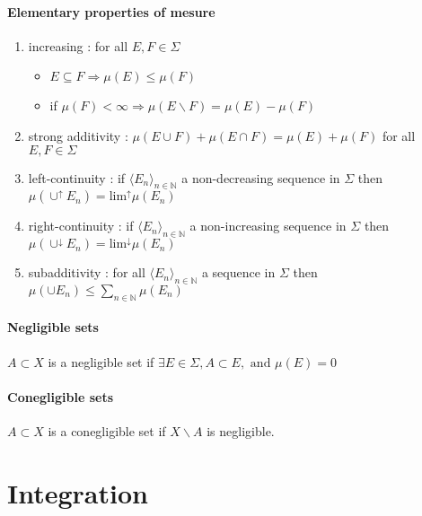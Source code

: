 \documentclass[a4paper,10pt]{article}
\begin{document}
\paragraph{Elementary properties of mesure}
\begin{enumerate}
 \item increasing : for all $E,F \in \Sigma$ 
 \begin{itemize}
  \item $E \subseteq F \Longrightarrow \mu(E) \leq \mu(F)$
  \item if $\mu(F) < \infty  \Longrightarrow \mu(E\backslash F) = \mu(E) - \mu(F)$
 \end{itemize}

 \item strong additivity : $\mu(E\cup F) + \mu(E\cap F) = \mu(E) + \mu(F)$ for all $E,F \in \Sigma$ 
 \item left-continuity : if $\langle E_{n} \rangle_{n \in \mathbb{N}}$ a non-decreasing sequence in $\Sigma$ then 
 $\mu(\cup^{\uparrow} E_{n}) = \text{lim}^{\uparrow} \mu(E_{n})$
 \item right-continuity : if $\langle E_{n} \rangle_{n \in \mathbb{N}}$ a non-increasing sequence in $\Sigma$ then 
 $\mu(\cup^{\downarrow} E_{n}) = \text{lim}^{\downarrow} \mu(E_{n})$
 \item subadditivity : for all $\langle E_{n} \rangle_{n \in \mathbb{N}}$ a sequence in $\Sigma$ then $\mu(\cup E_{n}) \leq \sum_{n \in \mathbb{N}}\mu(E_n) $
\end{enumerate}

\paragraph{Negligible sets} $A \subset X$ is a negligible set if $\exists E \in \Sigma, A \subset E, \text{ and } \mu(E)=0$
\paragraph{Conegligible sets} $A \subset X$ is a conegligible set if $X \backslash A$ is negligible.
















\section{Integration}
\end{document}
